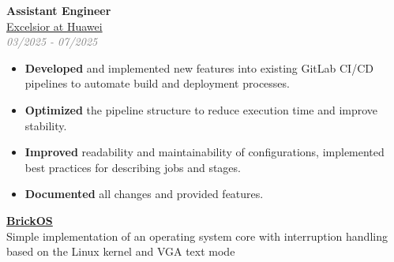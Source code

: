 \documentclass[10pt, a4paper]{article}
\begin{document}

\begin{minipage}[t]{0.6\textwidth}

\raggedright

\hspace{0.5cm}
\begin{minipage}[t]{0.9\textwidth}
    \textbf{\Large Assistant Engineer} \\[2pt]
    \textcolor{graytext}{\href{https://rnew.tilda.ws/excelsiorathuawei}{Excelsior at Huawei}}\extlink \\
    \textcolor{graytext}{\textit{03/2025 - 07/2025}}
    \begin{itemize}
        \item \textbf{Developed} and implemented new features into existing GitLab CI/CD pipelines to automate build and deployment processes.
        \item \textbf{Optimized} the pipeline structure to reduce execution time and improve stability.
        \item \textbf{Improved} readability and maintainability of configurations, implemented best practices for describing jobs and stages.  
        \item \textbf{Documented} all changes and provided features.
    \end{itemize}
\end{minipage}

\vspace{1cm}

\hspace{0.5cm}
\begin{minipage}[t]{0.9\textwidth}
    \textbf{\Large \href{https://github.com/B0GDANPN/BrickOS/tree/9-lab}{BrickOS}} \extlink \\[2pt]
    Simple implementation of an operating system core with interruption handling based on the Linux kernel and VGA text mode \\
\end{minipage}


\end{minipage}
\end{document}
